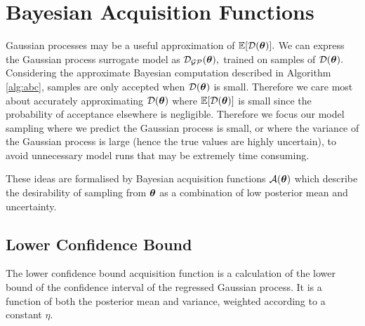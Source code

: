 

\section{Bayesian Acquisition Functions}

Gaussian processes may be a useful approximation of $\operatorname{\mathbb{E}}[\mathcal{D}(\bm{\theta})].$ We can
express the Gaussian process surrogate model as $\mathcal{D}_{\mathcal{GP}}(\bm{\theta}),$ trained on
samples of $\mathcal{D}(\bm{\theta}).$
Considering the approximate Bayesian computation described in
Algorithm \ref{alg:abc}, samples are only accepted when $\mathcal{D}(\bm{\theta})$ is small.
Therefore we care most about accurately approximating $\mathcal{D}(\bm{\theta})$ where
$\operatorname{\mathbb{E}}[\mathcal{D}(\bm{\theta})]$ is small since the probability of acceptance elsewhere is
negligible. Therefore we focus our model sampling where we predict the Gaussian
process is small, or where the variance of the Gaussian process is large
(hence the true values are highly uncertain), to avoid unnecessary model runs
that may be extremely time consuming.

These ideas are
formalised by Bayesian acquisition functions $\mathcal{A}(\bm{\theta})$ which
describe the desirability of sampling from $\bm{\theta}$ as a combination of low
posterior mean and uncertainty.

\subsection*{Lower Confidence Bound}

The lower confidence bound acquisition function is a calculation of the lower
bound of the confidence interval of the regressed Gaussian process. It is a
function of both the posterior mean and variance, weighted according to a
constant $\eta.$

